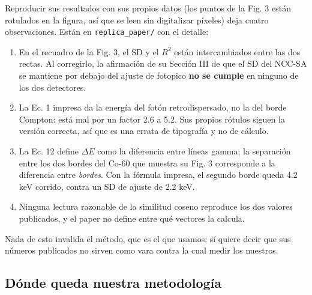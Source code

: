\documentclass[11pt,a4paper]{article}
\begin{document}
Reproducir sus resultados con sus propios datos (los puntos de la Fig. 3 están
rotulados en la figura, así que se leen sin digitalizar píxeles) deja cuatro
observaciones. Están en \texttt{replica\_paper/} con el detalle:

\begin{enumerate}
\item En el recuadro de la Fig. 3, el SD y el $R^2$ están intercambiados entre
      las dos rectas. Al corregirlo, la afirmación de su Sección III de que el
      SD del NCC-SA se mantiene por debajo del ajuste de fotopico \textbf{no se
      cumple} en ninguno de los dos detectores.
\item La Ec. 1 impresa da la energía del fotón retrodispersado, no la del borde
      Compton: está mal por un factor 2.6 a 5.2. Sus propios rótulos siguen la
      versión correcta, así que es una errata de tipografía y no de cálculo.
\item La Ec. 12 define $\Delta E$ como la diferencia entre líneas gamma; la
      separación entre los dos bordes del Co-60 que muestra su Fig. 3
      corresponde a la diferencia entre \emph{bordes}. Con la fórmula impresa,
      el segundo borde queda 4.2 keV corrido, contra un SD de ajuste de 2.2 keV.
\item Ninguna lectura razonable de la similitud coseno reproduce los dos
      valores publicados, y el paper no define entre qué vectores la calcula.
\end{enumerate}

Nada de esto invalida el método, que es el que usamos; sí quiere decir que sus
números publicados no sirven como vara contra la cual medir los nuestros.

\subsection{Dónde queda nuestra metodología}
\end{document}
